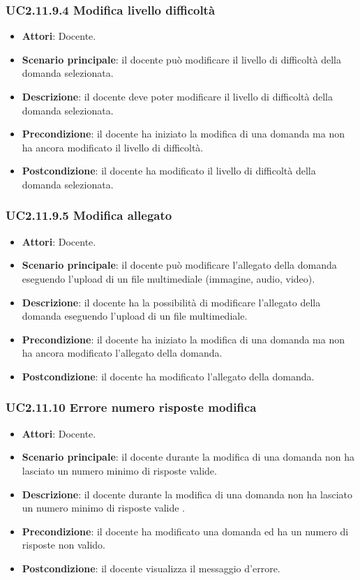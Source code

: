 \subsubsection{UC2.11.9.4 Modifica livello difficoltà}
\begin{itemize}
\item \textbf{Attori}: Docente.
\item \textbf{Scenario principale}: il docente può modificare il livello di difficoltà della domanda selezionata.
\item \textbf{Descrizione}: il docente deve poter modificare il livello di difficoltà della domanda selezionata.
\item \textbf{Precondizione}: il docente ha iniziato la modifica di una domanda ma non ha ancora modificato il livello di difficoltà.
\item \textbf{Postcondizione}: il docente ha modificato il livello di difficoltà della domanda selezionata.
\end{itemize}
\subsubsection{UC2.11.9.5 Modifica allegato}
\begin{itemize}
\item \textbf{Attori}: Docente.
\item \textbf{Scenario principale}: il docente può modificare l'allegato della domanda eseguendo l'upload di un file multimediale (immagine, audio, video).
\item \textbf{Descrizione}: il docente ha la possibilità di modificare l'allegato della domanda eseguendo l'upload di un file multimediale.
\item \textbf{Precondizione}: il docente ha iniziato la modifica di una domanda ma non ha ancora modificato l'allegato della domanda.
\item \textbf{Postcondizione}: il docente ha modificato l'allegato della domanda.
\end{itemize}
\subsubsection{UC2.11.10 Errore numero risposte modifica}
\begin{itemize}
\item \textbf{Attori}: Docente.
\item \textbf{Scenario principale}: il docente durante la modifica di una domanda non ha lasciato un numero minimo di risposte valide.
\item \textbf{Descrizione}: il docente durante la modifica di una domanda non ha lasciato un numero minimo di risposte valide
.
\item \textbf{Precondizione}: il docente ha modificato una domanda ed ha un numero di risposte non valido.
\item \textbf{Postcondizione}: il docente visualizza il messaggio d'errore.
\end{itemize}
